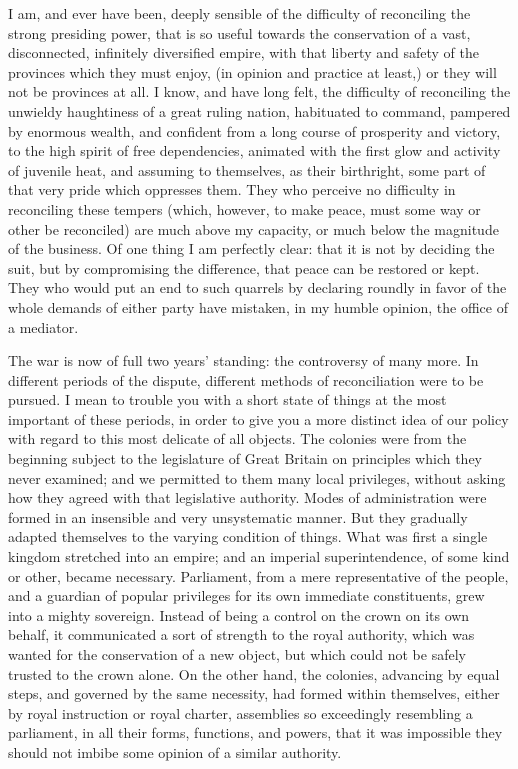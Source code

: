 I am, and ever have been, deeply sensible of the difficulty of reconciling the strong presiding power, that is so useful towards the conservation of a vast, disconnected, infinitely diversified empire, with that liberty and safety of the provinces which they must enjoy, (in opinion and practice at least,) or they will not be provinces at all. I know, and have long felt, the difficulty of reconciling the unwieldy haughtiness of a great ruling nation, habituated to command, pampered by enormous wealth, and confident from a long course of prosperity and victory, to the high spirit of free dependencies, animated with the first glow and activity of juvenile heat, and assuming to themselves, as their birthright, some part of that very pride which oppresses them. They who perceive no difficulty in reconciling these tempers (which, however, to make peace, must some way or other be reconciled) are much above my capacity, or much below the magnitude of the business. Of one thing I am perfectly clear: that it is not by deciding the suit, but by compromising the difference, that peace can be restored or kept. They who would put an end to such quarrels by declaring roundly in favor of the whole demands of either party have mistaken, in my humble opinion, the office of a mediator.

The war is now of full two years' standing: the controversy of many more. In different periods of the dispute, different methods of reconciliation were to be pursued. I mean to trouble you with a short state of things at the most important of these periods, in order to give you a more distinct idea of our policy with regard to this most delicate of all objects. The colonies were from the beginning subject to the legislature of Great Britain on principles which they never examined; and we permitted to them many local privileges, without asking how they agreed with that legislative authority. Modes of administration were formed in an insensible and very unsystematic manner. But they gradually adapted themselves to the varying condition of things. What was first a single kingdom stretched into an empire; and an imperial superintendence, of some kind or other, became necessary. Parliament, from a mere representative of the people, and a guardian of popular privileges for its own immediate constituents, grew into a mighty sovereign. Instead of being a control on the crown on its own behalf, it communicated a sort of strength to the royal authority, which was wanted for the conservation of a new object, but which could not be safely trusted to the crown alone. On the other hand, the colonies, advancing by equal steps, and governed by the same necessity, had formed within themselves, either by royal instruction or royal charter, assemblies so exceedingly resembling a parliament, in all their forms, functions, and powers, that it was impossible they should not imbibe some opinion of a similar authority.

